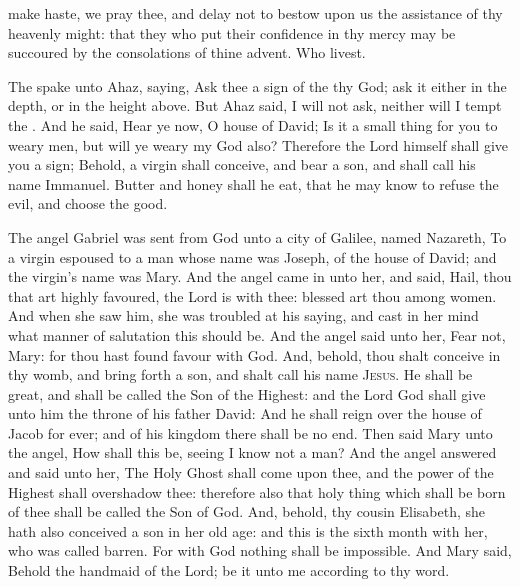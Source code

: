 
\collect
{} make haste, we pray thee, and delay not to bestow upon us the assistance of thy heavenly might: that they who put their confidence in thy mercy may be succoured by the consolations of thine advent. Who livest.

 The  spake unto Ahaz, saying, Ask thee a sign of the  thy God; ask it either in the depth, or in the height above. But Ahaz said, I will not ask, neither will I tempt the . And he said, Hear ye now, O house of David; Is it a small thing for you to weary men, but will ye weary my God also? Therefore the Lord himself shall give you a sign; Behold, a virgin shall conceive, and bear a son, and shall call his name Immanuel. Butter and honey shall he eat, that he may know to refuse the evil, and choose the good.


 The angel Gabriel was sent from God unto a city of Galilee, named Nazareth, To a virgin espoused to a man whose name was Joseph, of the house of David; and the virgin's name was Mary. And the angel came in unto her, and said, Hail, thou that art highly favoured, the Lord is with thee: blessed art thou among women. And when she saw him, she was troubled at his saying, and cast in her mind what manner of salutation this should be. And the angel said unto her, Fear not, Mary: for thou hast found favour with God. And, behold, thou shalt conceive in thy womb, and bring forth a son, and shalt call his name \textsc{Jesus}. He shall be great, and shall be called the Son of the Highest: and the Lord God shall give unto him the throne of his father David: And he shall reign over the house of Jacob for ever; and of his kingdom there shall be no end. Then said Mary unto the angel, How shall this be, seeing I know not a man? And the angel answered and said unto her, The Holy Ghost shall come upon thee, and the power of the Highest shall overshadow thee: therefore also that holy thing which shall be born of thee shall be called the Son of God. And, behold, thy cousin Elisabeth, she hath also conceived a son in her old age: and this is the sixth month with her, who was called barren. For with God nothing shall be impossible. And Mary said, Behold the handmaid of the Lord; be it unto me according to thy word.


